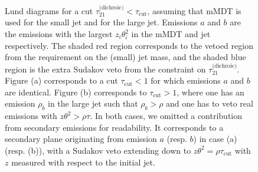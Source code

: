 \begin{figure}[t]
  \centering
  \hfill%
  \caption{Lund diagrams for a cut
    $\tau_{21}^{\text{(dichroic)}}<\tau_\text{cut}$, assuming that mMDT
  is used for the small jet and \SD for the large jet. Emissions $a$
  and $b$ are the emissions with the largest $z_i\theta_i^2$ in the
  mMDT and \SD jet respectively. The shaded red region corresponds to
  the vetoed region from the requirement on the (small) jet mass, and
  the shaded blue region is the extra Sudakov veto from the constraint
  on $\tau_{21}^{\text{(dichroic)}}$.
  Figure (a) corresponds to a cut
  $\tau_\text{cut}<1$ for which emissions $a$ and $b$ are identical.
  Figure (b) corresponds to $\tau_\text{cut}>1$, where one has an
  emission $\rho_b$ in the large jet such that $\rho_b>\rho$ and one
  has to veto real emissions with $z\theta^2>\rho\tau$.
  In both cases, we omitted a contribution from secondary emissions
  for readability. It corresponds to a secondary plane originating
  from emission $a$ (resp. $b$) in case (a) (resp. (b)), with a
  Sudakov veto extending down to $z\theta^2=\rho\tau_\text{cut}$ with
  $z$ measured with respect to the initial
  jet.}\label{fig:lund-dichroic-tau21}
\end{figure}  

